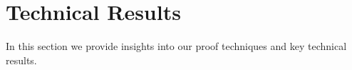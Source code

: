 \section{Technical Results}
\label{sec:technical_results}

In this section we provide insights into our proof techniques and key technical results.



\rd 



